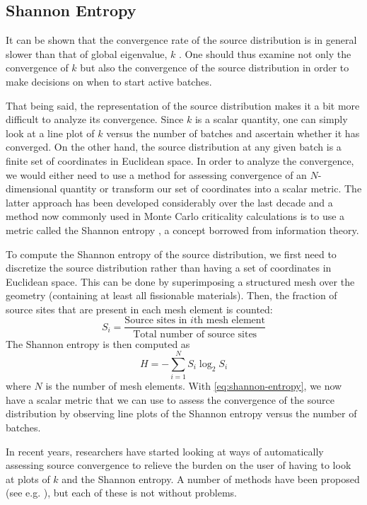 \subsection{Shannon Entropy}
\label{sec:shannon-entropy}

It can be shown that the convergence rate of the source distribution is in
general slower than that of global eigenvalue, $k$ \cite{lanl-brown-2005}. One
should thus examine not only the convergence of $k$ but also the convergence of
the source distribution in order to make decisions on when to start active
batches.

That being said, the representation of the source distribution makes it a bit
more difficult to analyze its convergence. Since $k$ is a scalar quantity, one
can simply look at a line plot of $k$ versus the number of batches and ascertain
whether it has converged. On the other hand, the source distribution at any
given batch is a finite set of coordinates in Euclidean space. In order to
analyze the convergence, we would either need to use a method for assessing
convergence of an $N$-dimensional quantity or transform our set of coordinates
into a scalar metric. The latter approach has been developed considerably over
the last decade and a method now commonly used in Monte Carlo criticality
calculations is to use a metric called the Shannon entropy
\cite{physor-brown-2006}, a concept borrowed from information theory.

To compute the Shannon entropy of the source distribution, we first need to
discretize the source distribution rather than having a set of coordinates in
Euclidean space. This can be done by superimposing a structured mesh over the
geometry (containing at least all fissionable materials). Then, the fraction of
source sites that are present in each mesh element is counted:
\begin{equation}
  \label{eq:fraction-source}
  S_i = \frac{\text{Source sites in $i$th mesh element}}{\text{Total number of
      source sites}}
\end{equation}
The Shannon entropy is then computed as
\begin{equation}
  \label{eq:shannon-entropy}
  H = - \sum_{i=1}^N S_i \log_2 S_i
\end{equation}
where $N$ is the number of mesh elements. With \eqref{eq:shannon-entropy}, we
now have a scalar metric that we can use to assess the convergence of the source
distribution by observing line plots of the Shannon entropy versus the number of
batches.

In recent years, researchers have started looking at ways of automatically
assessing source convergence to relieve the burden on the user of having to look
at plots of $k$ and the Shannon entropy. A number of methods have been proposed
(see e.g. \cite{mc-romano-2009, trans-ueki-2008}), but each of these is not
without problems.
